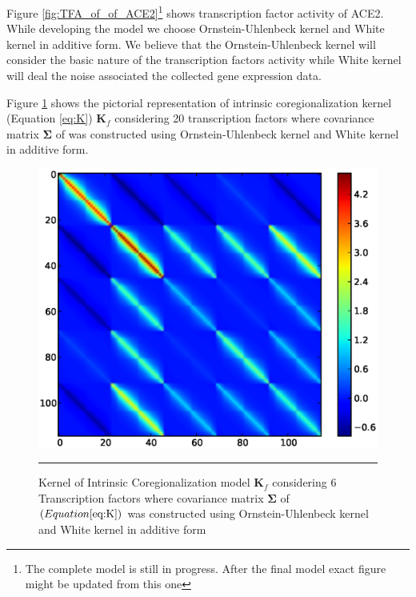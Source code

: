 Figure \ref{fig:TFA_of_of_ACE2}\footnote{The complete model is still in progress. 
After the final model exact figure might be updated from this one}
shows transcription factor activity of ACE2.
While developing the model we choose Ornstein-Uhlenbeck kernel and White kernel in additive form.
We believe that the Ornstein-Uhlenbeck kernel will consider the basic nature of the transcription
factors activity while White kernel will deal the noise associated the collected gene expression
data.

Figure \ref{fig:kern_6TF} shows the pictorial representation of intrinsic coregionalization kernel 
(Equation \ref{eq:K}) $\textbf{K}_f$ considering 20 transcription factors 
where covariance matrix $\boldsymbol{\Sigma}$ of  was 
constructed using Ornstein-Uhlenbeck kernel and White kernel in additive form.

\begin{figure}[t]
	\centering
		\includegraphics[width=\textwidth,keepaspectratio]{diagrams/kern_6TF.eps}
		\rule{35em}{0.5pt}
	\caption[Kernel of Intrinsic Coregionalization model $\textbf{K}_f$ considering 6 
		 Transcription factors where covariance matrix $\boldsymbol{\Sigma}$
		 was constructed using Ornstein-Uhlenbeck kernel and White kernel in additive form]
		{Kernel of Intrinsic Coregionalization model $\textbf{K}_f$ considering 6 
		 Transcription factors where covariance matrix $\boldsymbol{\Sigma}$ 
		 of $\left( Equation \ref{eq:K} \right)$ was constructed 
		 using Ornstein-Uhlenbeck kernel and White kernel in additive form}
	\label{fig:kern_6TF}
\end{figure}


